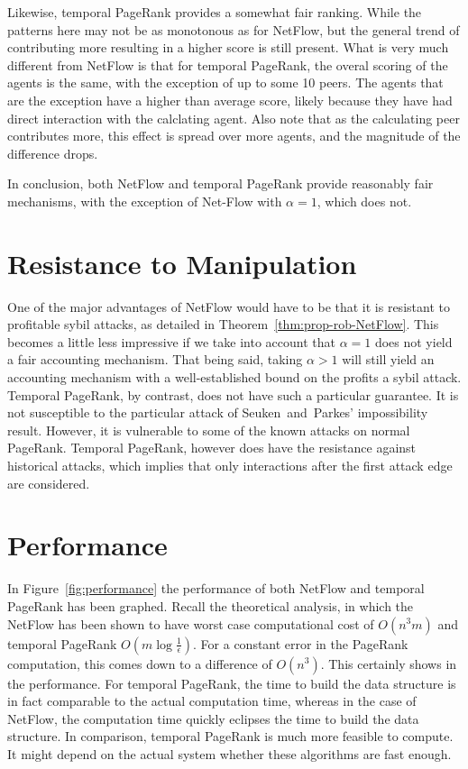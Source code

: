 \documentclass[a4paper,11pt]{book}
\newcommand{\eps}{\epsilon}
\theoremstyle{definition}
\begin{document}
Likewise, temporal PageRank provides a somewhat fair ranking. While the patterns here may not be as
monotonous as for NetFlow, but the general trend of contributing more resulting in a higher score
is still present. What is very much different from NetFlow is that for temporal PageRank, the overal
scoring of the agents is the same, with the exception of up to some 10 peers. The agents that are
the exception have a higher than average score, likely because they have had direct interaction with
the calclating agent. Also note that as the calculating peer contributes more, this effect is spread
over more agents, and the magnitude of the difference drops. 

In conclusion, both NetFlow and temporal PageRank provide reasonably fair mechanisms, with the
exception of Net-Flow with $\alpha=1$, which does not.

\section{Resistance to Manipulation}

One of the major advantages of NetFlow would have to be that it is resistant to profitable sybil attacks,
as detailed in Theorem~\ref{thm:prop-rob-NetFlow}. This becomes a little less impressive if we
take into account that $\alpha=1$ does not yield a fair accounting mechanism. That being said, taking
$\alpha > 1$ will still yield an accounting mechanism with a well-established bound on the profits
a sybil attack. Temporal PageRank, by contrast, does not have such a particular guarantee. It is not
susceptible to the particular attack of Seuken~and~Parkes' impossibility result. However, it is
vulnerable to some of the known attacks on normal PageRank. Temporal PageRank, however does have
the resistance against historical attacks, which implies that only interactions after the
first attack edge are considered.

\section{Performance}

In Figure~\ref{fig:performance} the performance of both NetFlow and temporal PageRank has been 
graphed. Recall the theoretical analysis, in which the NetFlow has been shown to have
worst case computational cost of $O(n^3m)$ and temporal PageRank $O(m\log\frac1\eps)$. For
a constant error in the PageRank computation, this comes down to a difference of $O(n^3)$.
This certainly shows in the performance. For temporal PageRank, the time to build the data structure
is in fact comparable to the actual computation time, whereas in the case of NetFlow, the computation
time quickly eclipses the time to build the data structure. In comparison, temporal PageRank is much 
more feasible to compute. It might depend on the actual system whether these algorithms are fast enough.
\end{document}
